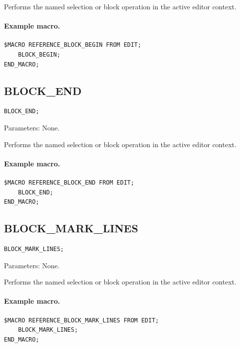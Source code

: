 \documentclass[a4paper,10pt,twoside,openany]{book}
\newenvironment{mrmacextension}{\begin{changebar}}{\end{changebar}}
\begin{document}
Performs the named selection or block operation in the active editor context.

\paragraph{Example macro.}
\begin{verbatim}
$MACRO REFERENCE_BLOCK_BEGIN FROM EDIT;
    BLOCK_BEGIN;
END_MACRO;
\end{verbatim}

\label{prim:procedure-block-end}
\subsection*{BLOCK\_END}
\begin{verbatim}
BLOCK_END;
\end{verbatim}
Parameters: None.

Performs the named selection or block operation in the active editor context.

\paragraph{Example macro.}
\begin{verbatim}
$MACRO REFERENCE_BLOCK_END FROM EDIT;
    BLOCK_END;
END_MACRO;
\end{verbatim}

\begin{mrmacextension}
\label{prim:procedure-block-mark-lines}
\subsection*{BLOCK\_MARK\_LINES}
\begin{verbatim}
BLOCK_MARK_LINES;
\end{verbatim}
Parameters: None.

Performs the named selection or block operation in the active editor context.

\paragraph{Example macro.}
\begin{verbatim}
$MACRO REFERENCE_BLOCK_MARK_LINES FROM EDIT;
    BLOCK_MARK_LINES;
END_MACRO;
\end{verbatim}
\end{mrmacextension}
\end{document}
